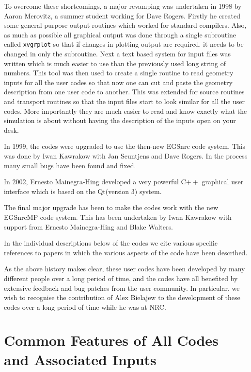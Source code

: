 \documentclass[12pt,twoside]{article}  %
\begin{document}
To overcome these shortcomings, a major revamping was undertaken in 1998
by Aaron Merovitz, a summer student working for Dave Rogers.  Firstly he
created some general purpose output routines which worked for standard
compilers. Also, as much as possible all graphical output was done through
a single subroutine called {\tt xvgrplot} so that if changes in plotting
output are required. it needs to be changed in only the subroutine.
Next a text based system for input files was written which is much easier
to use than the previously used long string of numbers.  This tool was
then used to create a single routine to read geometry inputs for all the
user codes so that now one can cut and paste the geometry description
from one user code to another. This was extended for source routines and
transport routines so that the input files start to look similar for all
the user codes.  More importantly they are much easier to read and know
exactly what the simulation is about without having the description of
the inputs open on your desk.

In 1999, the codes were upgraded to use the then-new EGSnrc code system.
This was done by Iwan Kawrakow with Jan Seuntjens and Dave Rogers.
In the process many small bugs have been found and fixed.

In 2002, Ernesto Mainegra-Hing developed a very powerful C$++$ graphical
user interface which is based on the Qt(version 3) system\cite{Ma03}.

The final major upgrade has been to make the codes work with the new
EGSnrcMP code system. This has been undertaken by Iwan Kawrakow with
support from Ernesto Mainegra-Hing and Blake Walters.

In the individual descriptions below of the codes we cite various specific
references to papers in which the various aspects of the code have been
described.

As the above history makes clear, these user codes have been developed
by many different people over a long period of time, and the codes
have all benefited by extensive feedback and bug patches from the user
community. In particular, we wish to recognise the contribution of Alex
Bielajew to the development of these codes over a long period of time
while he was at NRC.

\renewcommand{\leftmark}{{COMMON FEATURES}}
\section[Common Features]{Common Features of All Codes and Associated Inputs}
\label{Common}
\end{document}
